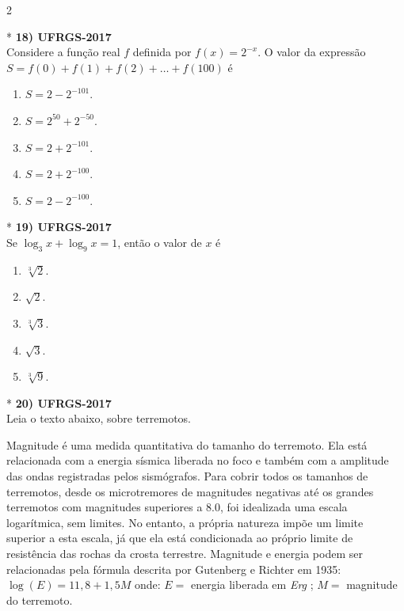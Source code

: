 \documentclass[11pt,a4paper]{article}
\begin{document}
\begin{paracol}{2}
\switchcolumn[1]
\vspace{6cm}

\switchcolumn[0]*
\textbf{18) UFRGS-2017} \\
Considere a função real $f$ definida por $f(x) = 2^{-x}$. O valor da expressão $S = f(0) + f(1) + f(2) + \dots + f(100)$ é

\begin{enumerate}[label=(\Alph*), itemsep=0.3cm]
    \item $S = 2 - 2^{-101}$.
    \item $S = 2^{50} + 2^{-50}$.
    \item $S = 2 + 2^{-101}$.
    \item $S = 2 + 2^{-100}$.
    \item $S = 2 - 2^{-100}$.
\end{enumerate}
\vspace{0.4cm}

\switchcolumn[1]
\vspace{8cm}

\switchcolumn[0]*
\textbf{19) UFRGS-2017} \\
Se $\log_3 x + \log_9 x = 1$, então o valor de $x$ é

\begin{enumerate}[label=(\Alph*), itemsep=0.3cm]
    \item $\sqrt[3]{2}$.
    \item $\sqrt{2}$.
    \item $\sqrt[3]{3}$.
    \item $\sqrt{3}$.
    \item $\sqrt[3]{9}$.
\end{enumerate}
\vspace{0.4cm}

\switchcolumn[1]
\vspace{8cm}

\switchcolumn[0]*
\textbf{20) UFRGS-2017} \\
Leia o texto abaixo, sobre terremotos.

Magnitude é uma medida quantitativa do tamanho do terremoto. Ela está relacionada com a energia sísmica liberada no foco e também com a amplitude das ondas registradas pelos sismógrafos. Para cobrir todos os tamanhos de terremotos, desde os microtremores de magnitudes negativas até os grandes terremotos com magnitudes superiores a 8.0, foi idealizada uma escala logarítmica, sem limites. No entanto, a própria natureza impõe um limite superior a esta escala, já que ela está condicionada ao próprio limite de resistência das rochas da crosta terrestre. Magnitude e energia podem ser relacionadas pela fórmula descrita por Gutenberg e Richter em 1935: $\log(E) = 11{,}8 + 1{,}5M$ onde: $E =$ energia liberada em \textit{Erg} ; $M =$ magnitude do terremoto.


\end{paracol}
\end{document}
